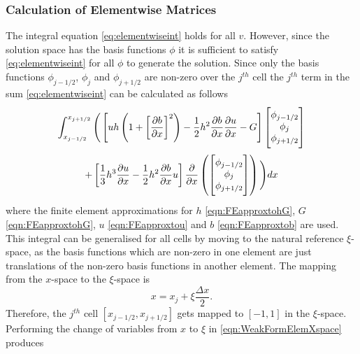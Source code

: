\subsubsection{Calculation of Elementwise Matrices}
The integral equation \eqref{eq:elementwiseint} holds for all $v$. However, since the solution space has the basis functions $\phi$ it is sufficient to satisfy \eqref{eq:elementwiseint} for all $\phi$ to generate the solution. Since only the basis functions $\phi_{j-1/2}$, $\phi_{j}$ and $\phi_{j+1/2}$ are non-zero over the $j^{th}$ cell the $j^{th}$ term in the sum \eqref{eq:elementwiseint} can be calculated as follows
\begin{multline}
\int_{x_{j-1/2} }^{{x_{j+1/2}}} \Bigg(  \left[ uh \left(1  +  \left[\frac{\partial b}{\partial x}\right]^2 \right)  - \frac{1}{2}h^2\frac{\partial b}{\partial x}  \frac{\partial u }{\partial x}  -  G \right] \begin{bmatrix} \TM
\phi_{j-1/2}\\\phi_j \\\phi_{j+1/2} \BM\end{bmatrix}   \\ +  \left[ \frac{1}{3}h^3  \frac{\partial {u}}{\partial x}    -     \frac{1}{2}h^2\frac{\partial b}{\partial x} u    \right] \frac{\partial}{\partial x}\left(\begin{bmatrix} \TM
\phi_{j-1/2}\\\phi_j \\\phi_{j+1/2}  \BM
\end{bmatrix} \right) \Bigg)dx
\label{eqn:WeakFormElemXspace}
\end{multline}
where the finite element approximations for $h$ \eqref{eqn:FEapproxtohG}, $G$ \eqref{eqn:FEapproxtohG}, $u$ \eqref{eqn:FEapproxtou} and $b$ \eqref{eqn:FEapproxtob} are used. This integral can be generalised for all cells by moving to the natural reference $\xi$-space, as the basis functions which are non-zero in one element are just translations of the non-zero basis functions in another element. The mapping from the $x$-space to the $\xi$-space is
\begin{equation*}
x = x_j + \xi \frac{\Delta x}{2}.
\end{equation*}
Therefore, the $j^{th}$ cell $\left[x_{j-1/2}, x_{j+1/2}\right]$ gets mapped to $\left[-1,1\right]$ in the $\xi$-space. Performing the change of variables from $x$ to $\xi$ in \eqref{eqn:WeakFormElemXspace} produces
